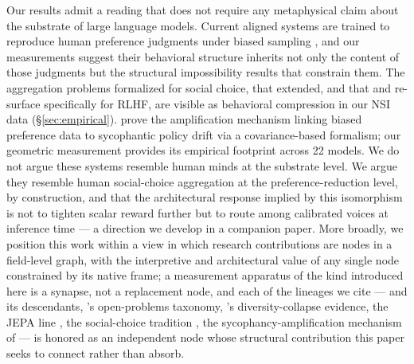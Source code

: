 \documentclass{article}
\begin{document}
Our results admit a reading that does not require any metaphysical claim about the substrate of large language models. Current aligned systems are trained to reproduce human preference judgments under biased sampling \citep{ouyang2022training, bai2022constitutional}, and our measurements suggest their behavioral structure inherits not only the content of those judgments but the structural impossibility results that constrain them. The aggregation problems \citet{arrow1950difficulty} formalized for social choice, that \citet{sen1970collective} extended, and that \citet{casper2023open} and \citet{chakraborty2024maxmin} re-surface specifically for RLHF, are visible as behavioral compression in our NSI data (\S\ref{sec:empirical}). \citet{shapira2026rlhf} prove the amplification mechanism linking biased preference data to sycophantic policy drift via a covariance-based formalism; our geometric measurement provides its empirical footprint across 22 models. We do not argue these systems resemble human minds at the substrate level. We argue they resemble human social-choice aggregation at the preference-reduction level, by construction, and that the architectural response implied by this isomorphism is not to tighten scalar reward further but to route among calibrated voices at inference time --- a direction we develop in a companion paper. More broadly, we position this work within a view in which research contributions are nodes in a field-level graph, with the interpretive and architectural value of any single node constrained by its native frame; a measurement apparatus of the kind introduced here is a synapse, not a replacement node, and each of the lineages we cite --- \citet{christiano2017deep} and its descendants, \citet{casper2023open}'s open-problems taxonomy, \citet{kirk2024understanding}'s diversity-collapse evidence, the JEPA line \citep{balestriero2025lejepa}, the social-choice tradition \citep{arrow1950difficulty, sen1970collective, kauffman1993origins}, the sycophancy-amplification mechanism of \citet{shapira2026rlhf} --- is honored as an independent node whose structural contribution this paper seeks to connect rather than absorb.
\end{document}
